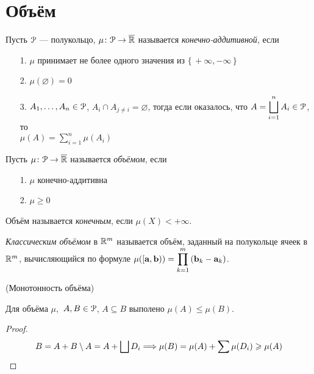 \section{Объём}

\begin{definition}
    Пусть $\mathcal{P}$ --- полукольцо, $\mu \colon \mathcal{P} \to \overline{\mathbb{R}}$ называется
    \textit{конечно-аддитивной}, если
    \begin{itemize}
        \item[1.] $\mu$ принимает не более одного значения из $\{\,+\infty, -\infty\,\}$
        \item[2.] $\mu(\varnothing) = 0$
        \item[3.] $A_1, \ldots, A_n \in \mathcal{P}$, $A_i \cap A_{j \neq i} = \varnothing$,
        тогда если оказалось, что $\displaystyle A = \bigsqcup_{i = 1}^{n}{A_i} \in \mathcal{P}$,
        то \\ $\displaystyle \mu(A) = \sum_{i = 1}^{n}{\mu(A_i)}$
    \end{itemize}
\end{definition}

\begin{definition}
    Пусть $\mu \colon \mathcal{P} \to \overline{\mathbb{R}}$ называется \textit{объёмом}, если
    \begin{itemize}
        \item[1.] $\mu$ конечно-аддитивна
        \item[2.] $\mu \geqslant 0$
    \end{itemize}
\end{definition}

\begin{definition}
    Объём называется \textit{конечным}, если $\mu(X) < +\infty$.
\end{definition}

\begin{definition}
    \textit{Классическим объёмом} в $\mathbb{R}^m$ называется объём, заданный на
    полукольце ячеек в $\mathbb{R}^m$, вычисляющийся по формуле
    $\displaystyle \mu([\mathbf{a}, \mathbf{b})) = \prod_{k = 1}^{m}{(\mathbf{b}_k - \mathbf{a}_k)}$.
\end{definition}

\begin{lemma}(Монотонность объёма)

    Для объёма $\mu,$ $A, B \in \mathcal{P}$, $A \subseteq B$ выполено $\mu(A) \leqslant \mu(B)$.
\end{lemma}
\begin{proof}
\[
    B = A + B \setminus A = A + \bigsqcup{D_i} \Longrightarrow \mu(B) = \mu(A) + \sum{\mu(D_i)}
    \geqslant \mu(A)
\]
\end{proof}

